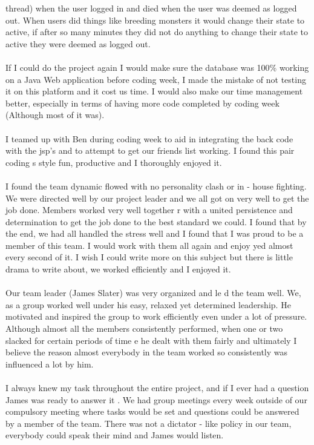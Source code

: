 \documentclass[titlepage]{article}
\begin{document}
{{{{thread) when the user logged in and died when the user was deemed as logged out. When users did 
things like breeding monsters it would change their state to active, if after so many minutes they did 
not do anything to change their state to active they were deemed as logged out. 
\\
\\
If I could do the project again I would make sure the database was 100\% working on a Java Web 
application before coding week, I made the mistake of not testing it on this platform and it cost us 
time. I would also make our time management better, 
especially in terms of having more code 
completed by coding week (Although most of it was). 
\\
\\
I teamed up with Ben during coding week to aid in integrating the back code with the jsp's and to 
attempt to get our friends list working. I found this pair coding s
style fun, productive and I thoroughly 
enjoyed it. 
\\
\\
I found the team dynamic flowed with no personality clash or in
-
house fighting. We were directed well 
by our project leader and we all got on very well to get the job done. Members worked very well 
together
r with a united persistence and determination to get the job done to the best standard we 
could. I found that by the end, we had all handled the stress well and I found that I was proud to be a 
member of this team. I would work with them all again and enjoy
yed almost every second of it. I wish I 
could write more on this subject but there is little drama to write about, we worked efficiently and I 
enjoyed it. 
\\
\\
Our team leader (James Slater) was very organized and le
d the team well. We, as a group 
worked well 
under his easy, relaxed yet determined leadership. He motivated and inspired the group to work 
efficiently even under a lot of pressure. Although almost all the members consistently performed, 
when one or two slacked for certain periods of time
e he dealt with them fairly and ultimately I believe 
the reason almost everybody in the team worked so consistently was influenced a lot by him. 
\\
\\
I always knew my task throughout the entire project, and if I ever had a question James was ready to 
answer it
. We had group meetings every week outside of our compulsory meeting where tasks would 
be set and questions could be answered by a member of the team. There was not a dictator
-
like policy 
in our team, everybody could speak their mind and James would listen. 
}}}}
\end{document}
